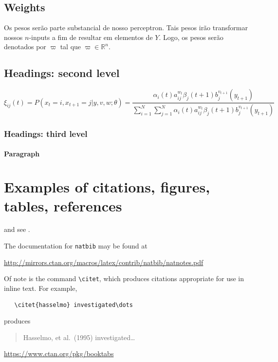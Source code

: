 \documentclass{article}
\begin{document}
\subsection[]{Weights}
Os pesos serão parte substancial de nosso perceptron. Tais pesos irão transformar nossos \(n\)-inputs a fim de resultar em elementos de \(Y\). Logo, os pesos serão denotados por \(\varpi\) tal que \(\varpi \in \mathbb{R}^n\). 


\subsection{Headings: second level}
\lipsum[5]
\begin{equation}
  \xi _{ij}(t)=P(x_{t}=i,x_{t+1}=j|y,v,w;\theta)= {\frac {\alpha _{i}(t)a^{w_t}_{ij}\beta _{j}(t+1)b^{v_{t+1}}_{j}(y_{t+1})}{\sum _{i=1}^{N} \sum _{j=1}^{N} \alpha _{i}(t)a^{w_t}_{ij}\beta _{j}(t+1)b^{v_{t+1}}_{j}(y_{t+1})}}
\end{equation}

\subsubsection{Headings: third level}
\lipsum[6]

\paragraph{Paragraph}
\lipsum[7]

\section{Examples of citations, figures, tables, references}
\label{sec:others}
\lipsum[8] \cite{kour2014real,kour2014fast} and see \cite{hadash2018estimate}.

The documentation for \verb+natbib+ may be found at
\begin{center}
  \url{http://mirrors.ctan.org/macros/latex/contrib/natbib/natnotes.pdf}
\end{center}
Of note is the command \verb+\citet+, which produces citations
appropriate for use in inline text.  For example,
\begin{verbatim}
   \citet{hasselmo} investigated\dots
\end{verbatim}
produces
\begin{quote}
  Hasselmo, et al.\ (1995) investigated\dots
\end{quote}

\begin{center}
  \url{https://www.ctan.org/pkg/booktabs}
\end{center}
\end{document}
